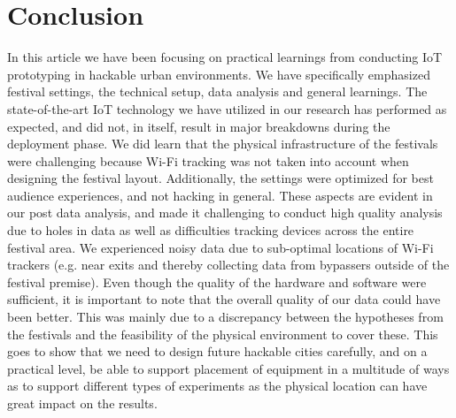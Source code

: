 \section{Conclusion}
In this article we have been focusing on practical learnings from conducting IoT prototyping in hackable urban environments. We have specifically emphasized festival settings, the technical setup, data analysis and general learnings. The state-of-the-art IoT technology we have utilized in our research has performed as expected, and did not, in itself, result in major breakdowns during the deployment phase. We did learn that the physical infrastructure of the festivals were challenging because Wi-Fi tracking was not taken into account when designing the festival layout. Additionally, the settings were optimized for best audience experiences, and not hacking in general. These aspects are evident in our post data analysis, and made it challenging to conduct high quality analysis due to holes in data as well as difficulties tracking devices across the entire festival area. We experienced noisy data due to sub-optimal locations of Wi-Fi trackers (e.g. near exits and thereby collecting data from bypassers outside of the festival premise). 
Even though the quality of the hardware and software were sufficient, it is important to note that the overall quality of our data could have been better. This was mainly due to a discrepancy between the hypotheses from the festivals and the feasibility of the physical environment to cover these. This goes to show that we need to design future hackable cities carefully, and on a practical level, be able to support placement of equipment in a multitude of ways as to support different types of experiments as the physical location can have great impact on the results.